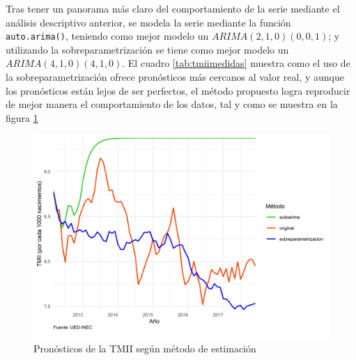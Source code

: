 \documentclass[
]{article}
\begin{document}
Tras tener un panorama más claro del comportamiento de la serie mediante
el análisis descriptivo anterior, se modela la serie mediante la función
\texttt{auto.arima()}, teniendo como mejor modelo un
\(ARIMA(2,1,0)(0,0,1)\); y utilizando la sobreparametrización se tiene
como mejor modelo un \(ARIMA(4,1,0)(4,1,0)\). El cuadro
\ref{tab:tmiimedidas} muestra como el uso de la sobreparametrización
ofrece pronósticos más cercanos al valor real, y aunque los pronósticos
están lejos de ser perfectos, el método propuesto logra reproducir de
mejor manera el comportamiento de los datos, tal y como se muestra en la
figura \ref{fig:tmiiplotpronostico}

\begin{table}[!h]

\caption{\label{tab:unnamed-chunk-16}\label{tab:tmiimedidas}Medidas de rendimiento según método de estimación para la TMII}
\centering
{}
\end{table}

\begin{figure}[!h]
\includegraphics[width=1\linewidth,height=1\textheight]{Tesis_files/figure-latex/tmiiplotpronostico-1} \caption{Pronósticos de la TMII según método de estimación}\label{fig:tmiiplotpronostico}
\end{figure}
\end{document}
